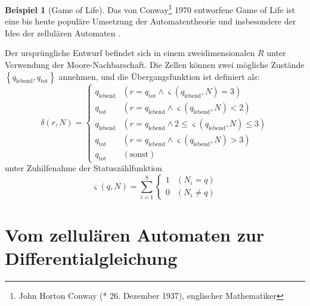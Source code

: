\documentclass[11pt]{report} %
\theoremstyle{definition}
\newtheorem*{beisp}{Beispiel}
\begin{document}
\begin{beisp}[Game of Life]

\newcommand{\ql}{q_\textrm{lebend}}
\newcommand{\qt}{q_\textrm{tot}}

Das von Conway\footnote{John Horton Conway (* 26. Dezember 1937), englischer Mathematiker\cite{wiki:conway}} 1970 entworfene Game of Life ist eine bis heute populäre Umsetzung der Automatentheorie und insbesondere der Idee der zellulären Automaten \cite{wiki:gameoflife}.

Der ursprüngliche Entwurf befindet sich in einem zweidimensionalen $R$ unter Verwendung der Moore-Nachbarschaft. Die Zellen können zwei mögliche Zustände $\left\{\ql, \qt \right\}$ annehmen, und die Übergangsfunktion ist definiert \cite{Hafner} als:
\begin{equation*}
\delta(r, N) = \begin{cases}
\ql & (r = \qt \land \varsigma(\ql,N) = 3) \\
\qt & (r = \ql \land \varsigma(\ql, N) < 2) \\
\ql & (r = \ql \land 2 \leq \varsigma(\ql, N) \leq 3) \\
\qt & (r = \ql \land  \varsigma(\ql, N) > 3) \\
\qt & (\textrm{sonst})
\end{cases}
\end{equation*}
unter Zuhilfenahme der Statuszählfunktion
\begin{equation*}
\varsigma(q, N) = \sum\limits_{i=1}^8  \begin{cases} 1 & (N_i = q) \\ 0 & (N_i \neq q) \end{cases}
\end{equation*}

\end{beisp}

\section{Vom zellulären Automaten zur Differentialgleichung}
\end{document}
